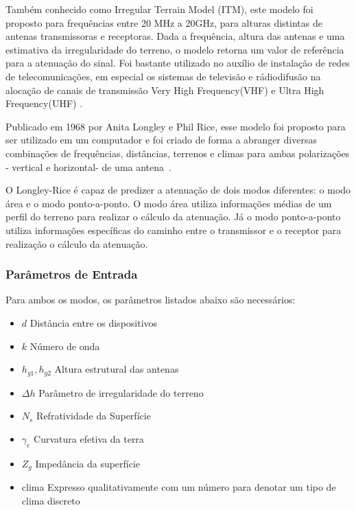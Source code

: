 Também conhecido como Irregular Terrain Model (ITM), este modelo foi proposto para frequências entre 20 MHz a 20GHz, para alturas distintas de antenas transmissoras e receptoras. Dada a frequência, altura das antenas e uma estimativa da irregularidade do terreno, o modelo retorna um valor de referência para a atenuação do sinal. Foi bastante utilizado no auxílio de instalação de redes de telecomunicações, em especial os sistemas de televisão e rádiodifusão na alocação de canais de transmissão Very High Frequency(VHF)
e Ultra High Frequency(UHF)
.

Publicado em 1968 por Anita Longley e Phil Rice, esse modelo foi proposto para ser utilizado em um computador e foi criado de forma a abranger diversas combinações de frequências, distâncias, terrenos e climas para ambas polarizações - vertical e horizontal- de uma antena~\cite{longleyrice}.

O Longley-Rice é capaz de predizer a atenuação de dois modos diferentes: o modo área e o modo ponto-a-ponto. O modo área utiliza informações médias de um perfil do terreno para realizar o cálculo da atenuação. Já o modo ponto-a-ponto utiliza informações específicas do caminho entre o transmissor e o receptor para realização o cálculo da atenuação.

\subsubsection{Parâmetros de Entrada}

Para ambos os modos, os parâmetros listados abaixo são necessários:

\begin{itemize}
\item \begin{math}d\end{math} Distância entre os dispositivos
\item \begin{math}k\end{math} Número de onda
\item \begin{math}h_{g1}, h_{g2}\end{math} Altura estrutural das antenas
\item \begin{math}\Delta h\end{math} Parâmetro de irregularidade do terreno
\item \begin{math}N_s\end{math} Refratividade da Superfície
\item \begin{math}\gamma _e\end{math} Curvatura efetiva da terra
\item \begin{math}Z_g\end{math} Impedância da superfície
\item clima Expresso qualitativamente com um número para denotar um tipo de clima discreto
\end{itemize}

